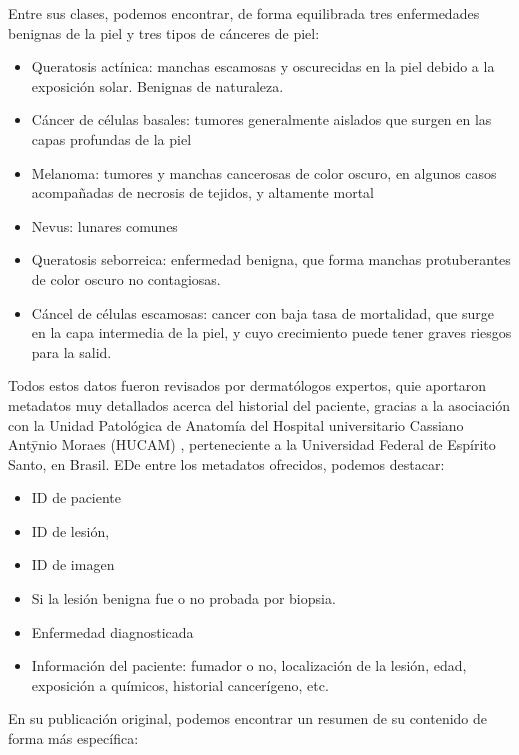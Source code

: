 Entre sus clases, podemos encontrar, de forma equilibrada tres enfermedades benignas de la piel y tres tipos de cánceres de piel:

\begin{itemize}
	\item Queratosis actínica: manchas escamosas y oscurecidas en la piel debido a la exposición solar. Benignas de naturaleza.
	\item Cáncer de células basales: tumores generalmente aislados que surgen en las capas profundas de la piel
	\item Melanoma: tumores y manchas cancerosas de color oscuro, en algunos casos acompañadas de necrosis de tejidos, y altamente mortal
	\item Nevus: lunares comunes
	\item Queratosis seborreica: enfermedad benigna, que forma manchas protuberantes de color oscuro no contagiosas.
	\item Cáncel de células escamosas: cancer con baja tasa de mortalidad, que surge en la capa intermedia de la piel, y cuyo crecimiento puede tener graves riesgos para la salid.
	\end{itemize}

 Todos estos datos fueron revisados por dermatólogos expertos, quie aportaron metadatos muy detallados acerca del historial del paciente, gracias a la asociación con la Unidad Patológica de Anatomía del Hospital universitario Cassiano Antȳnio Moraes (HUCAM) , perteneciente a la Universidad Federal de Espírito Santo, en Brasil. EDe entre los metadatos ofrecidos, podemos destacar:

\begin{itemize}
	\item ID de paciente
	\item ID de lesión,
	\item ID de imagen
	\item Si la lesión benigna fue o no probada por biopsia.
	\item Enfermedad diagnosticada
	\item Información del paciente: fumador o no, localización de la lesión, edad, exposición a químicos, historial cancerígeno, etc.
\end{itemize}

En su publicación original\cite{PACHECO2020106221}, podemos encontrar un resumen de su contenido de forma más específica:


